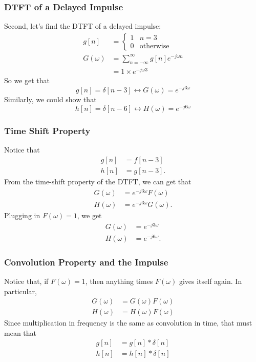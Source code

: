 \documentclass{beamer}
\begin{document}
\begin{frame}
  \frametitle{DTFT of a Delayed Impulse}

  Second, let's find the DTFT of a delayed impulse:
  \begin{align*}
    g[n] &= \begin{cases}1&n=3\\0&\mbox{otherwise}\end{cases}\\
    G(\omega) &= \sum_{n=-\infty}^\infty g[n]e^{-j\omega n}\\
    &= 1\times e^{-j\omega 3}
  \end{align*}
  So we get that
  \[
  g[n]=\delta[n-3]\leftrightarrow G(\omega)=e^{-j3\omega}
  \]
  Similarly, we could show that
  \[
  h[n]=\delta[n-6]\leftrightarrow H(\omega)=e^{-j6\omega}
  \]
\end{frame}

\begin{frame}
  \frametitle{Time Shift Property}

  Notice that
  \begin{align*}
    g[n] &= f[n-3]\\
    h[n] &= g[n-3].
  \end{align*}
  From the time-shift property of the DTFT, we can get that
  \begin{align*}
    G(\omega) &= e^{-j3\omega}F(\omega)\\
    H(\omega) &= e^{-j3\omega}G(\omega).
  \end{align*}
  Plugging in $F(\omega)=1$, we get
  \begin{align*}
    G(\omega) &= e^{-j3\omega}\\
    H(\omega) &= e^{-j6\omega}.
  \end{align*}
\end{frame}

\begin{frame}
  \frametitle{Convolution Property and the Impulse}

  Notice that, if $F(\omega)=1$, then anything times $F(\omega)$ gives
  itself again.  In particular,
  \begin{align*}
    G(\omega) &= G(\omega)F(\omega)\\
    H(\omega) &= H(\omega)F(\omega)
  \end{align*}
  Since multiplication in frequency is the same as convolution in time, that must mean that
  \begin{align*}
    g[n] &= g[n] \ast \delta[n]\\
    h[n] &= h[n]\ast \delta[n]
  \end{align*}
\end{frame}
\end{document}
